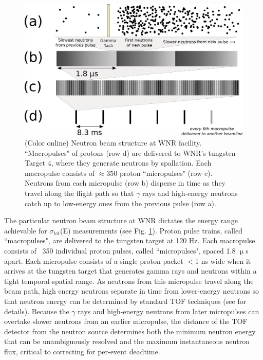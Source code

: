 \documentclass[twocolumn,secnumarabic,amssymb, nobibnotes, aps, prl,
superscriptaddress, nobalancelastpage]{revtex4}
\newcommand{\totEs}{\ensuremath{\sigma_{tot}}(E)\,\,}
\begin{document}
\begin{figure}
    \includegraphics[scale=0.4]{figures/beamStructure.png}
    \caption{(Color online) Neutron beam structure at WNR facility.
        ``Macropulses" of protons (row d) are delivered to
        WNR's tungsten Target 4, where they generate neutrons by spallation.
        Each macropulse consists of
        $\approx$350 proton ``micropulses" (row c). Neutrons
        from each micropulse (row b) disperse in
        time as they travel along the flight path so that $\gamma$ rays and high-energy 
    neutrons catch up to low-energy ones from the previous pulse (row a).}
    \label{BeamStructure}
\end{figure}

The particular neutron beam structure at WNR dictates the energy range
achievable for \totEs measurements (see Fig. \ref{BeamStructure}).
Proton pulse trains, called ``macropulses", are delivered to the tungsten target at 120 Hz.
Each macropulse consists of ~350 individual proton pulses, called ``micropulses", spaced 1.8 
$\upmu$s apart. Each micropulse consists of a single proton packet $<$1 ns wide when it 
arrives at the tungsten target that generates gamma rays and neutrons within a tight
temporal-spatial range. As neutrons from this micropulse travel along the beam path, 
high energy neutrons separate in time from lower-energy neutrons so that neutron
energy can be determined by standard TOF techniques (see \cite{Moore1980} for details).
Because the $\gamma$ rays and high-energy neutrons from later micropulses can
overtake slower neutrons from an earlier micropulse, the distance of the TOF
detector from the neutron source determines both the minimum neutron energy that can be 
unambiguously resolved and the maximum instantaneous neutron flux, critical to correcting
for per-event deadtime.
\end{document}
